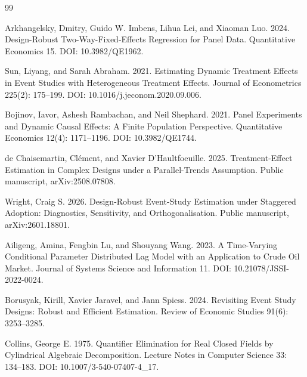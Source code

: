 \documentclass{article}
\begin{document}
\begin{thebibliography}{99}

   Arkhangelsky, Dmitry, Guido W. Imbens, Lihua Lei, and Xiaoman Luo. 2024. Design-Robust Two-Way-Fixed-Effects Regression for Panel Data. Quantitative Economics 15. DOI: 10.3982/QE1962.

   Sun, Liyang, and Sarah Abraham. 2021. Estimating Dynamic Treatment Effects in Event Studies with Heterogeneous Treatment Effects. Journal of Econometrics 225(2): 175--199. DOI: 10.1016/j.jeconom.2020.09.006.

   Bojinov, Iavor, Ashesh Rambachan, and Neil Shephard. 2021. Panel Experiments and Dynamic Causal Effects: A Finite Population Perspective. Quantitative Economics 12(4): 1171--1196. DOI: 10.3982/QE1744.

   de Chaisemartin, Clément, and Xavier D'Haultfoeuille. 2025. Treatment-Effect Estimation in Complex Designs under a Parallel-Trends Assumption. Public manuscript, arXiv:2508.07808.

   Wright, Craig S. 2026. Design-Robust Event-Study Estimation under Staggered Adoption: Diagnostics, Sensitivity, and Orthogonalisation. Public manuscript, arXiv:2601.18801.

   Ailigeng, Amina, Fengbin Lu, and Shouyang Wang. 2023. A Time-Varying Conditional Parameter Distributed Lag Model with an Application to Crude Oil Market. Journal of Systems Science and Information 11. DOI: 10.21078/JSSI-2022-0024.

   Borusyak, Kirill, Xavier Jaravel, and Jann Spiess. 2024. Revisiting Event Study Designs: Robust and Efficient Estimation. Review of Economic Studies 91(6): 3253--3285.

   Collins, George E. 1975. Quantifier Elimination for Real Closed Fields by Cylindrical Algebraic Decomposition. Lecture Notes in Computer Science 33: 134--183. DOI: 10.1007/3-540-07407-4\_17.

\end{thebibliography}
\end{document}
